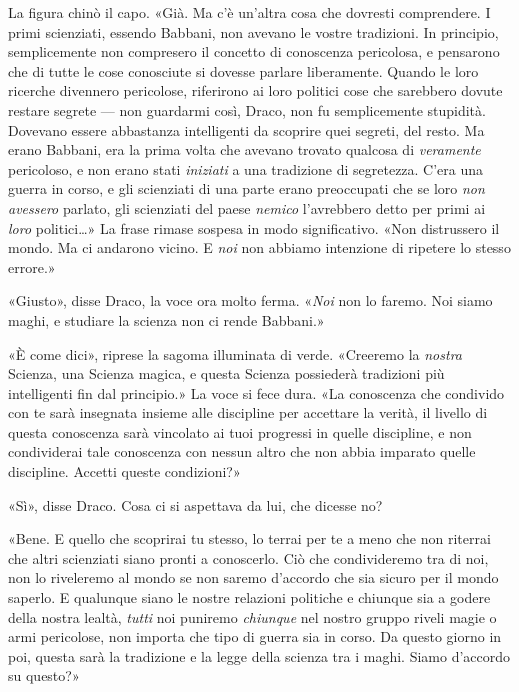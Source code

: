 La figura chinò il capo. «Già. Ma c’è un’altra cosa che dovresti comprendere. I primi scienziati, essendo Babbani, non avevano le vostre tradizioni. In principio, semplicemente non compresero il concetto di conoscenza pericolosa, e pensarono che di tutte le cose conosciute si dovesse parlare liberamente. Quando le loro ricerche divennero pericolose, riferirono ai loro politici cose che sarebbero dovute restare segrete — non guardarmi così, Draco, non fu semplicemente stupidità. Dovevano essere abbastanza intelligenti da scoprire quei segreti, del resto. Ma erano Babbani, era la prima volta che avevano trovato qualcosa di \textit{veramente} pericoloso, e non erano stati \textit{iniziati} a una tradizione di segretezza. C’era una guerra in corso, e gli scienziati di una parte erano preoccupati che se loro \textit{non avessero} parlato, gli scienziati del paese \textit{nemico} l’avrebbero detto per primi ai \textit{loro} politici…» La frase rimase sospesa in modo significativo. «Non distrussero il mondo. Ma ci andarono vicino. E \textit{noi} non abbiamo intenzione di ripetere lo stesso errore.»

«Giusto», disse Draco, la voce ora molto ferma. «\textit{Noi} non lo faremo. Noi siamo maghi, e studiare la scienza non ci rende Babbani.»

«È come dici», riprese la sagoma illuminata di verde. «Creeremo la \textit{nostra} Scienza, una Scienza magica, e questa Scienza possiederà tradizioni più intelligenti fin dal principio.» La voce si fece dura. «La conoscenza che condivido con te sarà insegnata insieme alle discipline per accettare la verità, il livello di questa conoscenza sarà vincolato ai tuoi progressi in quelle discipline, e non condividerai tale conoscenza con nessun altro che non abbia imparato quelle discipline. Accetti queste condizioni?»

«Sì», disse Draco. Cosa ci si aspettava da lui, che dicesse no?

«Bene. E quello che scoprirai tu stesso, lo terrai per te a meno che non riterrai che altri scienziati siano pronti a conoscerlo. Ciò che condivideremo tra di noi, non lo riveleremo al mondo se non saremo d’accordo che sia sicuro per il mondo saperlo. E qualunque siano le nostre relazioni politiche e chiunque sia a godere della nostra lealtà, \textit{tutti} noi puniremo \textit{chiunque} nel nostro gruppo riveli magie o armi pericolose, non importa che tipo di guerra sia in corso. Da questo giorno in poi, questa sarà la tradizione e la legge della scienza tra i maghi. Siamo d’accordo su questo?»

